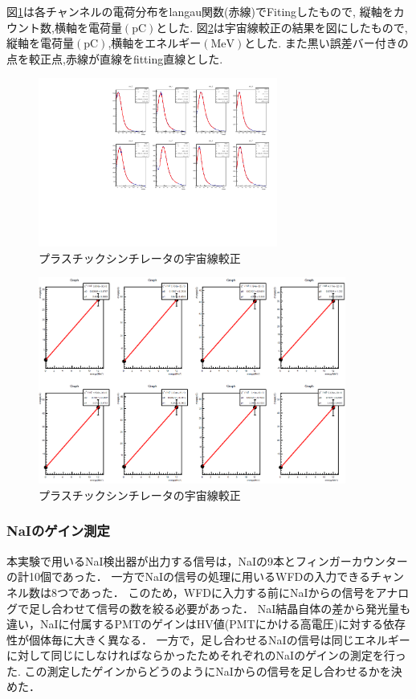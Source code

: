 図\ref{ps_langau}は各チャンネルの電荷分布をlangau関数(赤線)でFitingしたもので,
縦軸をカウント数,横軸を電荷量$(\mathrm{pC})$とした.
図\ref{ps_cali}は宇宙線較正の結果を図にしたもので,
縦軸を電荷量$(\mathrm{pC})$,横軸をエネルギー$(\mathrm{MeV})$とした.
また黒い誤差バー付きの点を較正点,赤線が直線をfitting直線とした.
\begin{figure}[H]
  \centering
  \includegraphics[width=0.7\textwidth,angle=-90]{figure/tajima/fit_langau.pdf}
  \caption{プラスチックシンチレータの宇宙線較正}\label{ps_langau}
\end{figure}
\begin{figure}[H]
  \centering
  \includegraphics[width=0.9\textwidth]{figure/tajima/fit_calibline.png}
  \caption{プラスチックシンチレータの宇宙線較正}\label{ps_cali}
\end{figure}

\subsubsection{NaIのゲイン測定}
本実験で用いるNaI検出器が出力する信号は，NaIの9本とフィンガーカウンターの計10個であった．
一方でNaIの信号の処理に用いるWFDの入力できるチャンネル数は8つであった．
このため，WFDに入力する前にNaIからの信号をアナログで足し合わせて信号の数を絞る必要があった．
NaI結晶自体の差から発光量も違い，NaIに付属するPMTのゲインはHV値(PMTにかける高電圧)に対する依存性が個体毎に大きく異なる．
一方で，足し合わせるNaIの信号は同じエネルギーに対して同じにしなければならかったためそれぞれのNaIのゲインの測定を行った.
この測定したゲインからどうのようにNaIからの信号を足し合わせるかを決めた．

